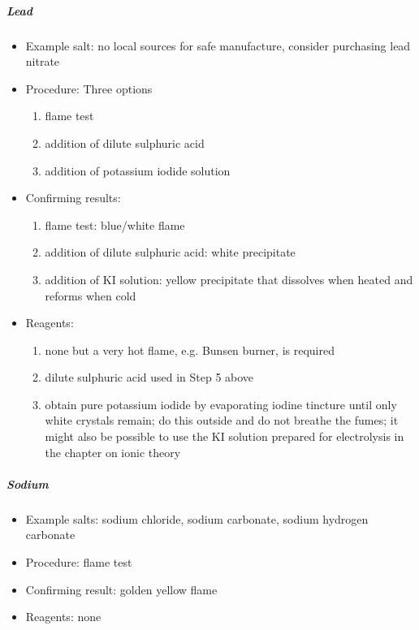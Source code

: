 \subparagraph{Lead}
\begin{itemize}
\item{Example salt: no local sources for safe manufacture, consider purchasing lead nitrate}

\item{Procedure: Three options
\begin{enumerate}
\item{flame test} 
\item{addition of dilute sulphuric acid}
\item{addition of potassium iodide solution}
\end{enumerate}
} %

\item{Confirming results:
\begin{enumerate}
\item{flame test: blue/white flame}
\item{addition of dilute sulphuric acid: white precipitate}
\item{addition of KI solution: yellow precipitate that dissolves when heated and reforms when cold}
\end{enumerate}
} %

\item{Reagents:
\begin{enumerate}
\item{none but a very hot flame, e.g. Bunsen burner, is required} 
\item{dilute sulphuric acid used in Step 5 above}
\item{obtain pure potassium iodide by evaporating iodine tincture until only white crystals remain; do this outside and do not breathe the fumes; it might also be possible to use the KI solution prepared for electrolysis in the chapter on ionic theory}
\end{enumerate}
} %

\end{itemize} %

\subparagraph{Sodium}
\begin{itemize}
\item{Example salts: sodium chloride, sodium carbonate, sodium hydrogen carbonate}
\item{Procedure: flame test}
\item{Confirming result: golden yellow flame}
\item{Reagents: none}
\end{itemize}

